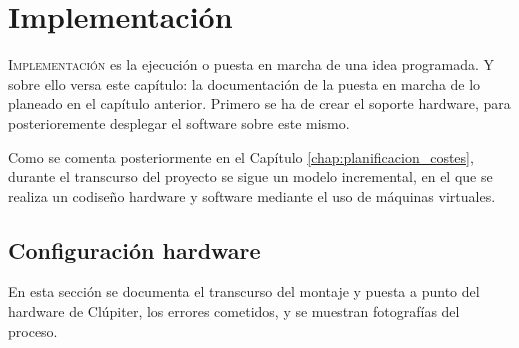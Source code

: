 \chapter{Implementación}
\label{chap:implementacion}

\lettrine{I}{mplementación} es la ejecución o puesta en marcha de una idea programada. Y sobre ello versa este capítulo: la documentación de la puesta en marcha de lo planeado en el capítulo anterior. Primero se ha de crear el soporte hardware, para posterioremente desplegar el software sobre este mismo.

Como se comenta posteriormente en el Capítulo \ref{chap:planificacion_costes}, durante el transcurso del proyecto se sigue un modelo incremental, en el que se realiza un codiseño hardware y software mediante el uso de máquinas virtuales.

\section{Configuración hardware}
\label{sec:configuracion_hardware}
En esta sección se documenta el transcurso del montaje y puesta a punto del hardware de Clúpiter, los errores cometidos, y se muestran fotografías del proceso.

